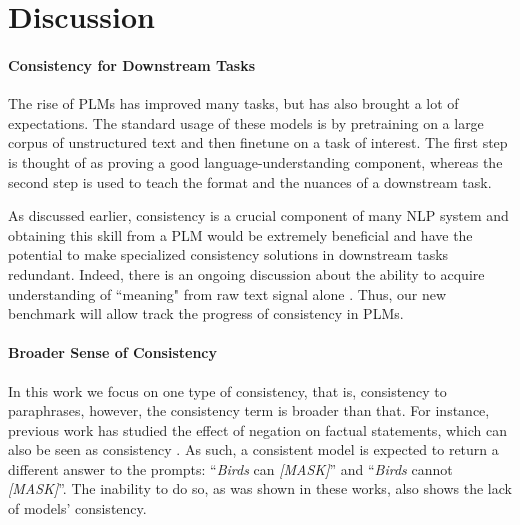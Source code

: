 \section{Discussion}
\label{sec:discussion}

\paragraph{Consistency for Downstream Tasks}

The rise of PLMs has improved many tasks, but has also brought a lot of expectations. The standard usage of these models is by pretraining on a large corpus of unstructured text and then finetune on a task of interest. The first step is thought of as proving a good language-understanding component, whereas the second step is used to teach the format and the nuances of a downstream task.

As discussed earlier, consistency is a crucial component of many NLP system \cite{du2019consistent,consistent-qa,denis2009global,kryscinski2020evaluating} and obtaining this skill from a PLM would be extremely beneficial and have the potential to make specialized consistency solutions in downstream tasks redundant.
Indeed, there is an ongoing discussion about the ability to acquire understanding of ``meaning" from raw text signal alone \cite{bender2020climbing}.
Thus, our new benchmark will allow track the progress of consistency in PLMs.


\paragraph{Broader Sense of Consistency}
In this work we focus on one type of consistency, that is, consistency to paraphrases, however, the consistency term is broader than that.
For instance, previous work has studied the effect of negation on factual statements, which can also be seen as consistency \cite{Ettinger_2020,kassner-schutze-2020-negated}. As such, a consistent model is expected to return a different answer to the prompts: ``\textit{Birds} can \textit{[MASK]}'' and ``\textit{Birds} cannot \textit{[MASK]}''. The inability to do so, as was shown in these works, also shows the lack of models' consistency.


